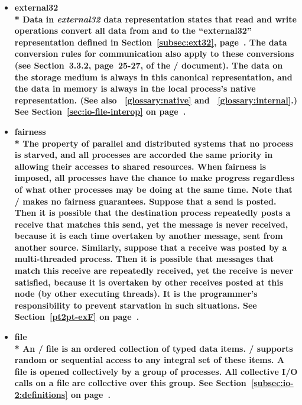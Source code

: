 \begin{itemize}
\label{glossary:external32}
\item \bf{ external32} \\*
Data in \emph{external32} data representation states that read and write operations
convert all data from
and to the ``external32''
representation defined in Section~\ref{subsec:ext32},
page~\pageref{subsec:ext32}.
The data conversion rules for communication also apply to these
conversions (see Section~3.3.2, page~25-27, of the \MPII/
document).
The data on the storage
medium is always in this canonical representation, and
the data in memory
is always in the local process's native representation.
(See also ~\ref{glossary:native} and ~\ref{glossary:internal}.)
See Section~\ref{sec:io-file-interop} on page~\pageref{sec:io-file-interop}.

\label{glossary:fairness}
\item \bf{ fairness} \\*
The property of parallel and distributed systems that no process is starved, 
and all processes are accorded the same priority in allowing their accesses 
to shared resources. When fairness is imposed, all processes have the 
chance to make progress regardless of what other processes may be 
doing at the same time. Note that \MPI/  makes no fairness guarantees.
Suppose that a send is posted.  Then it is possible
that the destination process repeatedly posts a receive that matches this
send, yet the message is never received, because it is each time overtaken by
another message, sent from another source.  Similarly, suppose that a
receive was posted by a multi-threaded process.  Then it is possible that
messages that
match this receive are repeatedly received, yet the receive is never satisfied,
because it is overtaken by other receives posted at this node (by
other executing threads).  It is the programmer's responsibility to prevent
starvation in such situations.
See Section~\ref{pt2pt-exF} on page~\pageref{pt2pt-exF}.

\label{glossary:file}
\item \bf{ file} \\*
An \MPI/ file is an ordered collection of typed data items.
\MPI/ supports random or sequential access to any integral set of these items.
A file is opened collectively by a group of processes.
All collective I/O calls on a file are collective over this group.
See Section~\ref{subsec:io-2:definitions} on page~\pageref{subsec:io-2:definitions}.


\end{itemize}
